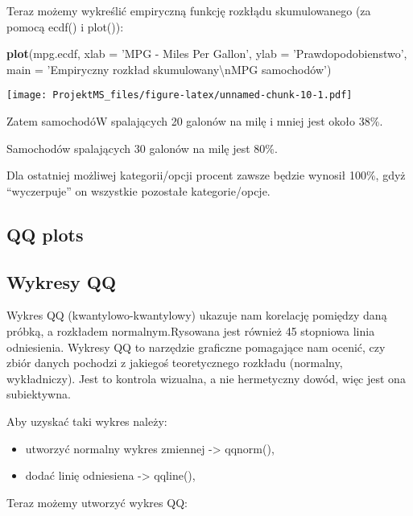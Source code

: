 \documentclass[
]{article}
\newenvironment{Shaded}{\begin{snugshade}}{\end{snugshade}}
\newcommand{\CharTok}[1]{\textcolor[rgb]{0.31,0.60,0.02}{#1}}
\newcommand{\DataTypeTok}[1]{\textcolor[rgb]{0.13,0.29,0.53}{#1}}
\newcommand{\KeywordTok}[1]{\textcolor[rgb]{0.13,0.29,0.53}{\textbf{#1}}}
\newcommand{\NormalTok}[1]{#1}
\newcommand{\StringTok}[1]{\textcolor[rgb]{0.31,0.60,0.02}{#1}}
\begin{document}
Teraz możemy wykreślić empiryczną funkcję rozkłądu skumulowanego (za
pomocą ecdf() i plot()):

\begin{Shaded}
\begin{Highlighting}[]
\KeywordTok{plot}\NormalTok{(mpg.ecdf, }\DataTypeTok{xlab =} \StringTok{'MPG - Miles Per Gallon'}\NormalTok{, }\DataTypeTok{ylab =} \StringTok{'Prawdopodobienstwo'}\NormalTok{, }\DataTypeTok{main =} \StringTok{'Empiryczny rozkład skumulowany}\CharTok{\textbackslash{}n}\StringTok{MPG samochodów')}
\end{Highlighting}
\end{Shaded}

\texttt{[image: ProjektMS\_files/figure-latex/unnamed-chunk-10-1.pdf]}

Zatem samochodóW spalających 20 galonów na milę i mniej jest około 38\%.

Samochodów spalających 30 galonów na milę jest 80\%.

Dla ostatniej możliwej kategorii/opcji procent zawsze będzie wynosił
100\%, gdyż ``wyczerpuje'' on wszystkie pozostałe kategorie/opcje.

\hypertarget{qq-plots}{%
\subsection{QQ plots}\label{qq-plots}}

\hypertarget{wykresy-qq}{%
\subsection{Wykresy QQ}\label{wykresy-qq}}

Wykres QQ (kwantylowo-kwantylowy) ukazuje nam korelację pomiędzy daną
próbką, a rozkładem normalnym.Rysowana jest również 45 stopniowa linia
odniesienia. Wykresy QQ to narzędzie graficzne pomagające nam ocenić,
czy zbiór danych pochodzi z jakiegoś teoretycznego rozkładu (normalny,
wykładniczy). Jest to kontrola wizualna, a nie hermetyczny dowód, więc
jest ona subiektywna.

Aby uzyskać taki wykres należy:

\begin{itemize}
\item
  utworzyć normalny wykres zmiennej -\textgreater{} qqnorm(),
\item
  dodać linię odniesiena -\textgreater{} qqline(),
\end{itemize}

Teraz możemy utworzyć wykres QQ:
\end{document}
